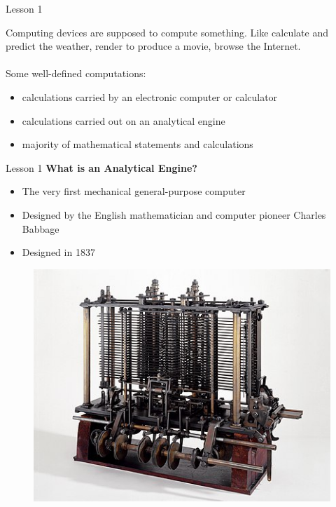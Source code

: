 \documentclass[aspectratio=1610]{beamer}
\begin{document}
\begin{frame}{Lesson 1}{}

\Large
Computing devices are supposed to compute something. Like calculate and predict the weather, render to produce a movie, browse the Internet.   \\~\\ 
Some well-defined computations:

\begin{itemize}
    \item calculations carried by an electronic computer or calculator
    \item calculations carried out on an \alert{analytical engine}
    \item majority of mathematical statements and calculations
\end{itemize}
\end{frame}


\begin{frame}{Lesson 1}{}
{\Large\textbf{{What is an Analytical Engine?}}}
\Large
\begin{minipage}{0.55\textwidth}
    \begin{itemize}
      \item The very first mechanical general-purpose computer
      \item Designed by the English mathematician and computer pioneer Charles Babbage
      \item Designed in 1837
    \end{itemize}
  \end{minipage}
\begin{minipage}{0.35\textwidth}
      \begin{figure}
        \includegraphics[scale=0.45]{Images/Babbages_AnalyticalEngine}
      \end{figure}
  \end{minipage}  
\end{frame}
\end{document}
